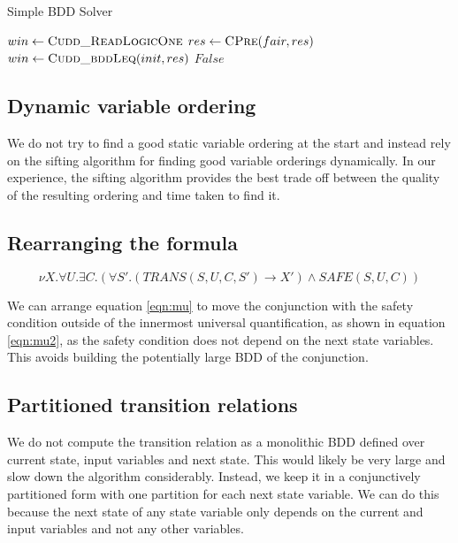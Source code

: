 \begin{algorithm}
\caption{Simple BDD Solver}
\label{alg:syntcomp}

\begin{algorithmic}

\State $win \gets \Call{Cudd\_ReadLogicOne}{}$
\Loop
    \State $res \gets \Call{CPre}{fair, res}$
    \State $win \gets \Call{Cudd\_bddLeq}{init, res}$
        \State \Return $False$
    \EndIf
\EndLoop

\end{algorithmic}
\end{algorithm}

\subsection{Dynamic variable ordering}
We do not try to find a good static variable ordering at the start and instead rely on the sifting algorithm for finding good variable orderings dynamically. In our experience, the sifting algorithm provides the best trade off between the quality of the resulting ordering and time taken to find it. 

\subsection{Rearranging the formula}
\begin{equation}
\label{eqn:mu2}
\nu X. \forall U. \exists C. (\forall S'. (TRANS(S, U, C, S') \rightarrow X') \wedge SAFE(S, U, C))
\end{equation}

We can arrange equation \ref{eqn:mu} to move the conjunction with the safety condition outside of the innermost universal quantification, as shown in equation \ref{eqn:mu2}, as the safety condition does not depend on the next state variables. This avoids building the potentially large BDD of the conjunction.

\subsection{Partitioned transition relations}
We do not compute the transition relation as a monolithic BDD defined over current state, input variables and next state. This would likely be very large and slow down the algorithm considerably. Instead, we keep it in a conjunctively partitioned form with one partition for each next state variable. We can do this because the next state of any state variable only depends on the current and input variables and not any other variables. 

